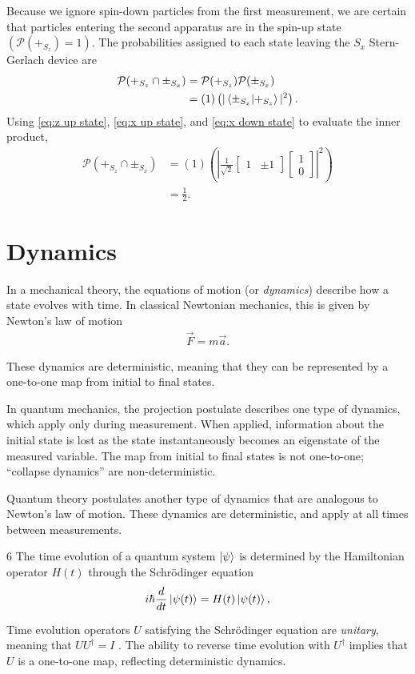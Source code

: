 Because we ignore spin-down particles from the first measurement, we are certain that particles entering the second apparatus are in the spin-up state $\left(\mathcal{P}(+_{S_z}) = 1 \right)$. The probabilities assigned to each state leaving the $S_x$ Stern-Gerlach device are
\begin{align} \label{eq:standard conditional probabilites}
    \mathcal{P}(+_{S_z} \cap \pm_{S_x}) &= \mathcal{P}(+_{S_z})\mathcal{P}(\pm_{S_x})  \\ \nonumber
    &= (1)\left(|\braket{\pm_{S_x}|+_{S_z}}|^2\right).
\end{align}
Using \autoref{eq:z up state}, \autoref{eq:x up state}, and \autoref{eq:x down state} to evaluate the inner product,
\begin{align}
  \mathcal{P}(+_{S_z} \cap \pm_{S_x}) &= (1)\left(\left|
\frac{1}{\sqrt{2}}\begin{bmatrix} 1 & \pm 1 \end{bmatrix} \begin{bmatrix} 1 \\ 0 \end{bmatrix} \right|^2 \right) \\ \nonumber
  &= \frac{1}{2}.
\end{align}

\section{Dynamics}
In a mechanical theory, the equations of motion (or \textit{dynamics}) describe how a state evolves with time. In classical Newtonian mechanics, this is given by Newton's law of motion
\begin{align}
  \vec{F} = m\vec{a}.
\end{align}

These dynamics are deterministic, meaning that they can be represented by a one-to-one map from initial to final states.

In quantum mechanics, the projection postulate describes one type of dynamics, which apply only during measurement. When applied, information about the initial state is lost as the state instantaneously becomes an eigenstate of the measured variable. The map from initial to final states is not one-to-one; ``collapse dynamics'' are non-deterministic.

Quantum theory postulates another type of dynamics that are analogous to Newton's law of motion. These dynamics are deterministic, and apply at all times between measurements.
\begin{Thm:Postulate}{6}
  The time evolution of a quantum system $\ket{\psi}$ is determined by the Hamiltonian operator $H(t)$ through the Schrödinger equation
  \begin{align}
    i\hbar \frac{d}{dt} \ket{\psi(t)} = H(t)\ket{\psi(t)},
  \end{align}
\end{Thm:Postulate}
Time evolution operators $U$ satisfying the Schrödinger equation are \textit{unitary}, meaning that $UU^\dagger = I$ \cite{Griffiths}. The ability to reverse time evolution with $U^\dagger$ implies that $U$ is a one-to-one map, reflecting deterministic dynamics.

